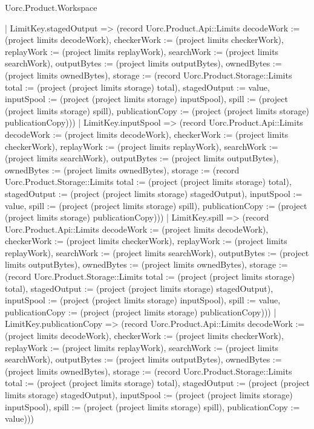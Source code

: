 \begin{lexlean}{Uorc.Product.Workspace}
\begin{semanticmodule}
{    | LimitKey.stagedOutput => (record Uorc.Product.Api::Limits {decodeWork := (project limits decodeWork), checkerWork := (project limits checkerWork), replayWork := (project limits replayWork), searchWork := (project limits searchWork), outputBytes := (project limits outputBytes), ownedBytes := (project limits ownedBytes), storage := (record Uorc.Product.Storage::Limits {total := (project (project limits storage) total), stagedOutput := value, inputSpool := (project (project limits storage) inputSpool), spill := (project (project limits storage) spill), publicationCopy := (project (project limits storage) publicationCopy)})})
    | LimitKey.inputSpool => (record Uorc.Product.Api::Limits {decodeWork := (project limits decodeWork), checkerWork := (project limits checkerWork), replayWork := (project limits replayWork), searchWork := (project limits searchWork), outputBytes := (project limits outputBytes), ownedBytes := (project limits ownedBytes), storage := (record Uorc.Product.Storage::Limits {total := (project (project limits storage) total), stagedOutput := (project (project limits storage) stagedOutput), inputSpool := value, spill := (project (project limits storage) spill), publicationCopy := (project (project limits storage) publicationCopy)})})
    | LimitKey.spill => (record Uorc.Product.Api::Limits {decodeWork := (project limits decodeWork), checkerWork := (project limits checkerWork), replayWork := (project limits replayWork), searchWork := (project limits searchWork), outputBytes := (project limits outputBytes), ownedBytes := (project limits ownedBytes), storage := (record Uorc.Product.Storage::Limits {total := (project (project limits storage) total), stagedOutput := (project (project limits storage) stagedOutput), inputSpool := (project (project limits storage) inputSpool), spill := value, publicationCopy := (project (project limits storage) publicationCopy)})})
    | LimitKey.publicationCopy => (record Uorc.Product.Api::Limits {decodeWork := (project limits decodeWork), checkerWork := (project limits checkerWork), replayWork := (project limits replayWork), searchWork := (project limits searchWork), outputBytes := (project limits outputBytes), ownedBytes := (project limits ownedBytes), storage := (record Uorc.Product.Storage::Limits {total := (project (project limits storage) total), stagedOutput := (project (project limits storage) stagedOutput), inputSpool := (project (project limits storage) inputSpool), spill := (project (project limits storage) spill), publicationCopy := value})}))
}


\end{semanticmodule}
\end{lexlean}
